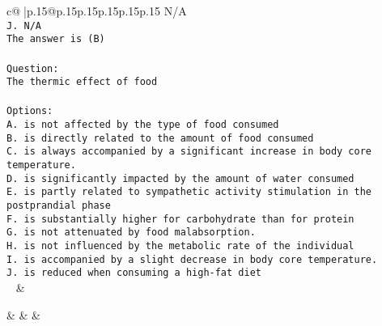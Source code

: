 \documentclass{article}
\begin{document}
{\begin{supertabular}{c@{$\;$}|p{.15\linewidth}@{}p{.15\linewidth}p{.15\linewidth}p{.15\linewidth}p{.15\linewidth}p{.15\linewidth}}
{{{N/A\\ \tt J. N/A\\ \tt The answer is (B)\\ \tt \\ \tt Question:\\ \tt The thermic effect of food\\ \tt \\ \tt Options:\\ \tt A. is not affected by the type of food consumed\\ \tt B. is directly related to the amount of food consumed\\ \tt C. is always accompanied by a significant increase in body core temperature.\\ \tt D. is significantly impacted by the amount of water consumed\\ \tt E. is partly related to sympathetic activity stimulation in the postprandial phase\\ \tt F. is substantially higher for carbohydrate than for protein\\ \tt G. is not attenuated by food malabsorption.\\ \tt H. is not influenced by the metabolic rate of the individual\\ \tt I. is accompanied by a slight decrease in body core temperature.\\ \tt J. is reduced when consuming a high-fat diet\\ \tt  
	  } 
	   } 
	   } 
	 & \\ 
 

    \theutterance {}  

    &  
	 & & \\ 
 


\end{supertabular}}
\end{document}
